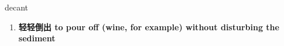 
\begin{frame}
{\huge decant}
\begin{center}
\begin{enumerate}\Large
  \item \textbf{轻轻倒出 to pour off (wine, for example) without disturbing the sediment}
\end{enumerate}
\end{center}
\end{frame}
